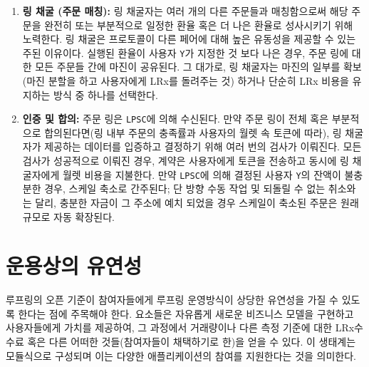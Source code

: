 \documentclass{article}
\makeatletter
\newenvironment{figurehere}
{\def\@captype{figure}}
{}
\makeatother
\begin{document}
\begin{multicols}{2}
\begin{enumerate}
\begin{center}
\begin{figurehere}
		
		\caption{루프팅 거래 과정}
		\label{fig:process}
	\end{figurehere}
\end{center}

\item \textbf{링 채굴 (주문 매칭):} 링 채굴자는 여러 개의 다른 주문들과 매칭함으로써 해당 주문을 완전히 또는 부분적으로 일정한 환율 혹은 더 나은 환율로 성사시키기 위해 노력한다. 링 채굴은 프로토콜이 다른 페어에 대해 높은 유동성을 제공할 수 있는 주된 이유이다. 실행된 환율이 사용자 \verb|Y|가 지정한 것 보다 나은 경우, 주문 링에 대한 모든 주문들 간에 마진이 공유된다. 그 대가로, 링 채굴자는 마진의 일부를 확보(마진 분할을 하고 사용자에게 LRx를 돌려주는 것) 하거나 단순히 LRx 비용을 유지하는 방식 중 하나를 선택한다.

\item \textbf{인증 및 합의:} 주문 링은 \verb|LPSC|에 의해 수신된다. 만약 주문 링이 전체 혹은 부분적으로 합의된다면(링 내부 주문의 충족률과 사용자의 월렛 속 토큰에 따라), 링 채굴자가 제공하는 데이터를 입증하고 결정하기 위해 여러 번의 검사가 이뤄진다. 모든 검사가 성공적으로 이뤄진 경우, 계약은 사용자에게 토큰을 전송하고 동시에 링 채굴자에게 월렛 비용을 지불한다. 만약 \verb|LPSC|에 의해 결정된 사용자 \verb|Y|의 잔액이 불충분한 경우, 스케일 축소로 간주된다; 단 방향 수동 작업 및 되돌릴 수 없는 취소와는 달리, 충분한 자금이 그 주소에 예치 되었을 경우 스케일이 축소된 주문은 원래 규모로 자동 확장된다.

\end{enumerate}



\section{운용상의 유연성\label{sec:business_model}}
루프링의 오픈 기준이 참여자들에게 루프링 운영방식이 상당한 유연성을 가질 수 있도록 한다는 점에 주목해야 한다. 요소들은 자유롭게 새로운 비즈니스 모델을 구현하고 사용자들에게 가치를 제공하여, 그 과정에서 거래량이나 다른 측정 기준에 대한 LRx수수료 혹은 다른 어떠한 것들(참여자들이 채택하기로 한)을 얻을 수 있다. 이 생태계는 모듈식으로 구성되며 이는 다양한 애플리케이션의 참여를 지원한다는 것을 의미한다.


\end{multicols}
\end{document}
